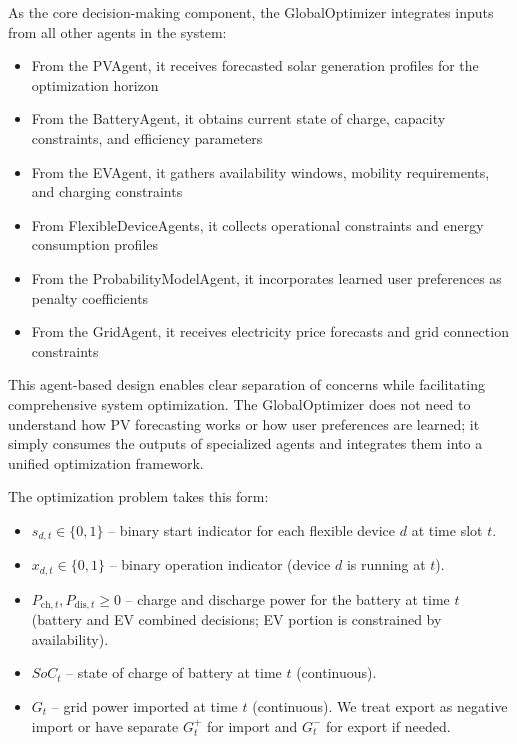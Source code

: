 \documentclass[12pt,a4paper]{article}
\begin{document}
As the core decision-making component, the GlobalOptimizer integrates inputs from all other agents in the system:
\begin{itemize}
    \item From the PVAgent, it receives forecasted solar generation profiles for the optimization horizon
    \item From the BatteryAgent, it obtains current state of charge, capacity constraints, and efficiency parameters
    \item From the EVAgent, it gathers availability windows, mobility requirements, and charging constraints
    \item From FlexibleDeviceAgents, it collects operational constraints and energy consumption profiles
    \item From the ProbabilityModelAgent, it incorporates learned user preferences as penalty coefficients
    \item From the GridAgent, it receives electricity price forecasts and grid connection constraints
\end{itemize}

This agent-based design enables clear separation of concerns while facilitating comprehensive system optimization. The GlobalOptimizer does not need to understand how PV forecasting works or how user preferences are learned; it simply consumes the outputs of specialized agents and integrates them into a unified optimization framework.

The optimization problem takes this form:
\begin{itemize}
    \item $s_{d,t} \in \{0,1\}$ – binary start indicator for each flexible device $d$ at time slot $t$.
    \item $x_{d,t} \in \{0,1\}$ – binary operation indicator (device $d$ is running at $t$).
    \item $P_{\text{ch},t}, P_{\text{dis},t} \ge 0$ – charge and discharge power for the battery at time $t$ (battery and EV combined decisions; EV portion is constrained by availability).
    \item $SoC_t$ – state of charge of battery at time $t$ (continuous).
    \item $G_t$ – grid power imported at time $t$ (continuous). We treat export as negative import or have separate $G^+_t$ for import and $G^-_t$ for export if needed.
\end{itemize}
\end{document}
